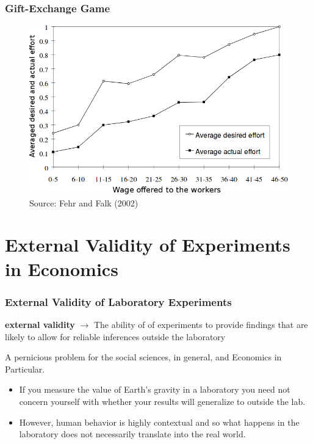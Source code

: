 \documentclass{beamer}
\begin{document}
\begin{frame}
	\frametitle{Gift-Exchange Game}
	\begin{figure}
	\includegraphics[scale=0.4]{imagens/gift1.png}
	\caption{Source: Fehr and Falk (2002)}
	\end{figure}
\end{frame}

\section{External Validity of Experiments in Economics}


\begin{frame}
\frametitle{External Validity of Laboratory Experiments}

\textbf{external validity} $\rightarrow$ The ability of of experiments to provide findings that are likely to allow for reliable inferences outside the laboratory

A pernicious problem for the social sciences, in general, and Economics in Particular.

\begin{itemize}
\item If you measure the value of Earth's gravity in a laboratory you need not concern yourself with whether your results will generalize to outside the lab.
\item However, human behavior is highly contextual and so what happens in the laboratory does not necessarily translate into the real world. 
\end{itemize}
\end{frame}
\end{document}
